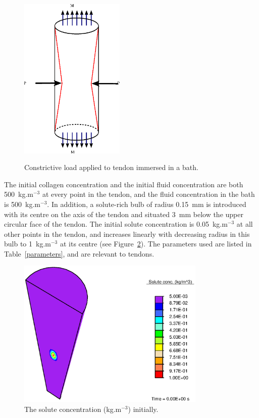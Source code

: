 \begin{figure}[!hpt]
  \centering
         {\includegraphics[width=5.0cm]{images/examples/lagrangian/constriction/cylinder-in-bath}}
	 \caption{Constrictive load applied to tendon immersed in a
	 bath.} 
	 \label{constrictload}
\end{figure}

The 
initial collagen concentration and the initial fluid concentration are
both 500~kg.m$^{-3}$ at every point in the tendon, and the fluid
concentration in the bath is 500~kg.m$^{-3}$. In
addition, a solute-rich bulb of radius 0.15~mm is introduced with
its centre on the axis of the tendon and situated 3~mm below the upper
circular face of the tendon. The initial solute concentration is
0.05~kg.m$^{-3}$ at all other points in the tendon, and increases
linearly with decreasing radius in this bulb to 1~kg.m$^{-3}$ at its
centre (see Figure~\ref{eg3ini}). The
parameters used are listed in Table~\ref{parameters}, and are relevant
to tendons.

\begin{figure}[!hpt]
\centering
\includegraphics[width=0.8\textwidth]{images/examples/lagrangian/medication/initial-solute-concentration}
\caption{The solute concentration (kg.m$^{-3}$) initially.}
\label{eg3ini}
\end{figure}

